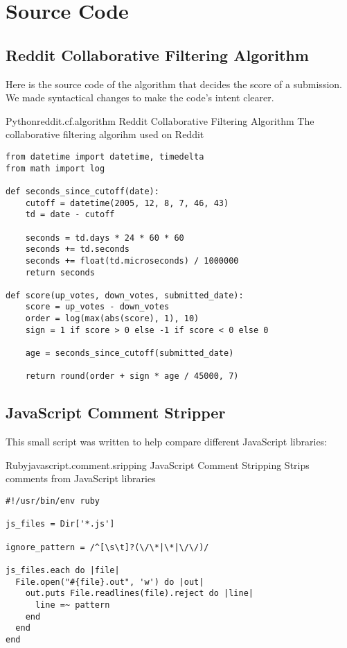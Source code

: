 \chapter{Source Code}

\section{Reddit Collaborative Filtering Algorithm}
\label{section:source.code.reddit}

Here is the source code of the algorithm that decides the score of a
submission. We made syntactical changes to make the code's intent clearer.

\begin{scode}{Python}{reddit.cf.algorithm}{%
  Reddit Collaborative Filtering Algorithm}{%
  The collaborative filtering algorihm used on Reddit}
\begin{lstlisting}
from datetime import datetime, timedelta
from math import log

def seconds_since_cutoff(date):
    cutoff = datetime(2005, 12, 8, 7, 46, 43)
    td = date - cutoff

    seconds = td.days * 24 * 60 * 60
    seconds += td.seconds
    seconds += float(td.microseconds) / 1000000
    return seconds

def score(up_votes, down_votes, submitted_date):
    score = up_votes - down_votes
    order = log(max(abs(score), 1), 10)
    sign = 1 if score > 0 else -1 if score < 0 else 0

    age = seconds_since_cutoff(submitted_date)

    return round(order + sign * age / 45000, 7)
\end{lstlisting}
\end{scode}


\section{JavaScript Comment Stripper}
\label{section:source.code.javascript.comment.stripper}

This small script was written to help
compare different JavaScript libraries:


\begin{scode}{Ruby}{javascript.comment.sripping}{%
  JavaScript Comment Stripping}{%
  Strips comments from JavaScript libraries}
\begin{lstlisting}
#!/usr/bin/env ruby

js_files = Dir['*.js']

ignore_pattern = /^[\s\t]?(\/\*|\*|\/\/)/

js_files.each do |file|
  File.open("#{file}.out", 'w') do |out| 
    out.puts File.readlines(file).reject do |line|
      line =~ pattern
    end
  end
end
\end{lstlisting}
\end{scode}

